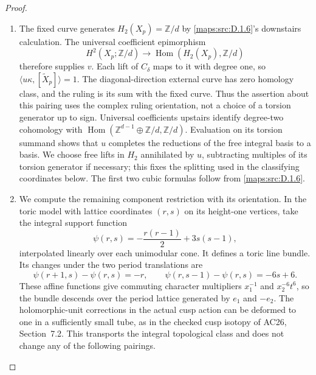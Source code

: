 \begin{proof}
\begin{enumerate}[label=\arabic*.,leftmargin=*]
\item The fixed curve generates $H_2(X_p)=\mathbb Z/d$ by \ref{maps:src:D.1.6}'s
downstairs calculation. The universal coefficient epimorphism
\[
 H^2(X_p;\mathbb Z/d)\longrightarrow
 \operatorname{Hom}(H_2(X_p),\mathbb Z/d)
\]
therefore supplies $v$. Each lift of $C_\delta$ maps to it with
degree one, so $\langle u\kappa,[\widetilde X_p]\rangle=1$.
The diagonal-direction external curve has zero homology class,
and the ruling is its sum with the fixed curve. Thus the assertion
about this pairing uses the complex ruling orientation, not a
choice of a torsion generator up to sign. Universal coefficients
upstairs identify degree-two cohomology with
$\operatorname{Hom}(\mathbb Z^{d-1}\oplus\mathbb Z/d,\mathbb Z/d)$.
Evaluation on its torsion summand shows that $u$ completes the
reductions of the free integral basis to a basis. We choose free
lifts in $H_2$ annihilated by $u$, subtracting multiples of its
torsion generator if necessary; this fixes the splitting used in
the classifying coordinates below. The first two
cubic formulas follow from \ref{maps:src:D.1.6}.

\item We compute the remaining component restriction with its orientation.
In the toric model with lattice coordinates $(r,s)$ on its height-one
vertices, take the integral support function
\[
 \psi(r,s)=-\frac{r(r-1)}2+3s(s-1),
\]
interpolated linearly over each unimodular cone. It defines a toric
line bundle. Its changes under the two period translations are
\[
 \psi(r+1,s)-\psi(r,s)=-r,
 \qquad
 \psi(r,s-1)-\psi(r,s)=-6s+6.
\]
These affine functions give commuting character multipliers
$x_1^{-1}$ and $x_2^{-6}t^6$, so the bundle descends over the
period lattice generated by $e_1$ and $-e_2$. The holomorphic-unit
corrections in the actual cusp action can be deformed to one in a
sufficiently small tube, as in the checked cusp isotopy of AC26,
Section~7.2. This transports the integral topological class and
does not change any of the following pairings.


\end{enumerate}
\end{proof}
